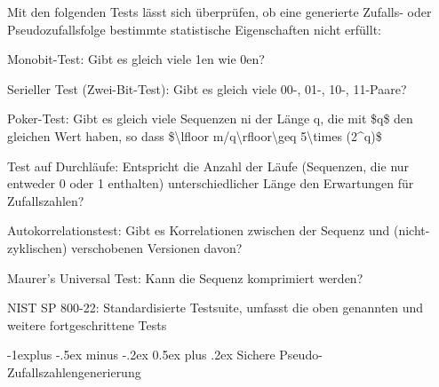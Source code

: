 \documentclass[a4paper]{article}
\makeatletter
\renewcommand{\subsection}{\@startsection{subsection}{2}{0mm}%
 {-1explus -.5ex minus -.2ex}%
 {0.5ex plus .2ex}%
 {\normalfont\normalsize\bfseries}}
\makeatother
\begin{document}
\begin{multicols}{3}
      \begin{itemize*}
            \item Mit den folgenden Tests lässt sich überprüfen, ob eine generierte
            Zufalls- oder Pseudozufallsfolge bestimmte statistische Eigenschaften
            nicht erfüllt:
            \begin{itemize*}
                  \item Monobit-Test: Gibt es gleich viele 1en wie 0en?
                  \item Serieller Test (Zwei-Bit-Test): Gibt es gleich viele 00-, 01-, 10-, 11-Paare?
                  \item Poker-Test: Gibt es gleich viele Sequenzen ni der Länge q, die mit \$q\$ den gleichen Wert haben, so dass \$\textbackslash lfloor m/q\textbackslash rfloor\textbackslash geq 5\textbackslash times (2\^{}q)\$
                  \item Test auf Durchläufe: Entspricht die Anzahl der Läufe (Sequenzen, die nur entweder 0 oder 1 enthalten) unterschiedlicher Länge den Erwartungen für Zufallszahlen?
                  \item Autokorrelationstest: Gibt es Korrelationen zwischen der Sequenz und (nicht-zyklischen) verschobenen Versionen davon?
                  \item Maurer's Universal Test: Kann die Sequenz komprimiert werden?
                  \item NIST SP 800-22: Standardisierte Testsuite, umfasst die oben genannten und weitere fortgeschrittene Tests
            \end{itemize*}
      \end{itemize*}


      \subsection{Sichere
            Pseudo-Zufallszahlengenerierung}


\end{multicols}
\end{document}
